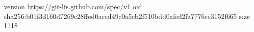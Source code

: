 version https://git-lfs.github.com/spec/v1
oid sha256:b01f3d160d7269c28ffed0aced49c0a5cb2f510bdd0afed2fa7776ec3152f665
size 1118

